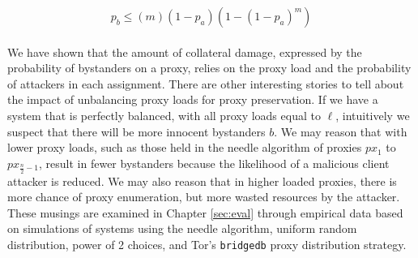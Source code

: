 $$p_b \leq (m)(1-p_a)(1-(1-p_a)^{m})$$\\

We have shown that the amount of collateral damage, expressed by the probability of bystanders on a proxy, relies on the proxy load and the probability of attackers in each assignment. There are other interesting stories to tell about the impact of unbalancing proxy loads for proxy preservation. If we have a system that is perfectly balanced, with all proxy loads equal to $\ell$, intuitively we suspect that there will be more innocent bystanders $b$. We may reason that with lower proxy loads, such as those held in the needle algorithm of proxies $px_1$ to $px_{\frac{n}{2}-1}$, result in fewer bystanders because the likelihood of a malicious client attacker is reduced. We may also reason that in higher loaded proxies, there is more chance of proxy enumeration, but more wasted resources by the attacker. These musings are examined in Chapter \ref{sec:eval} through empirical data based on simulations of systems using the needle algorithm, uniform random distribution, power of 2 choices, and Tor's \texttt{bridgedb} proxy distribution strategy. 